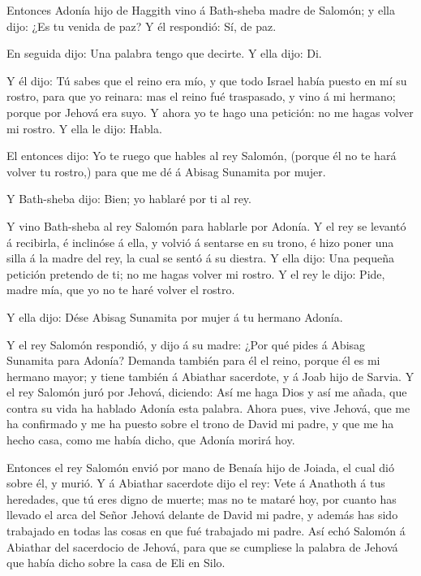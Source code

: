  Entonces Adonía hijo de Haggith vino á Bath-sheba madre de
Salomón; y ella dijo: ¿Es tu venida de paz? Y él respondió: Sí, de paz.

 En seguida dijo: Una palabra tengo que decirte. Y ella
dijo: Di.

 Y él dijo: Tú sabes que el reino era mío, y que todo
Israel había puesto en mí su rostro, para que yo reinara: mas el reino
fué traspasado, y vino á mi hermano; porque por Jehová era suyo.
 Y ahora yo te hago una petición: no me hagas volver mi
rostro. Y ella le dijo: Habla.

 El entonces dijo: Yo te ruego que hables al rey Salomón,
(porque él no te hará volver tu rostro,) para que me dé á Abisag
Sunamita por mujer.

 Y Bath-sheba dijo: Bien; yo hablaré por ti al rey.

 Y vino Bath-sheba al rey Salomón para hablarle por Adonía.
Y el rey se levantó á recibirla, é inclinóse á ella, y volvió á sentarse
en su trono, é hizo poner una silla á la madre del rey, la cual se sentó
á su diestra.  Y ella dijo: Una pequeña petición pretendo
de ti; no me hagas volver mi rostro. Y el rey le dijo: Pide, madre mía,
que yo no te haré volver el rostro.

 Y ella dijo: Dése Abisag Sunamita por mujer á tu hermano
Adonía.

 Y el rey Salomón respondió, y dijo á su madre: ¿Por qué
pides á Abisag Sunamita para Adonía? Demanda también para él el reino,
porque él es mi hermano mayor; y tiene también á Abiathar sacerdote, y á
Joab hijo de Sarvia.  Y el rey Salomón juró por Jehová,
diciendo: Así me haga Dios y así me añada, que contra su vida ha hablado
Adonía esta palabra.  Ahora pues, vive Jehová, que me ha
confirmado y me ha puesto sobre el trono de David mi padre, y que me ha
hecho casa, como me había dicho, que Adonía morirá hoy.

 Entonces el rey Salomón envió por mano de Benaía hijo de
Joiada, el cual dió sobre él, y murió.  Y á Abiathar
sacerdote dijo el rey: Vete á Anathoth á tus heredades, que tú eres
digno de muerte; mas no te mataré hoy, por cuanto has llevado el arca
del Señor Jehová delante de David mi padre, y además has sido trabajado
en todas las cosas en que fué trabajado mi padre.  Así echó
Salomón á Abiathar del sacerdocio de Jehová, para que se cumpliese la
palabra de Jehová que había dicho sobre la casa de Eli en Silo.

